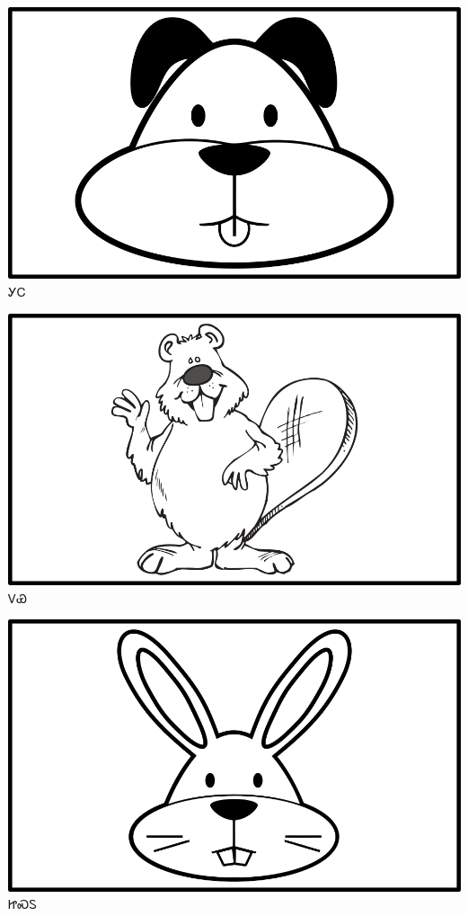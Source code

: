\documentclass[avery5371]{flashcards}%
\begin{document}
    \begin{flashcard}{
        \includegraphics[width=0.95\columnwidth,height=.51\columnwidth,keepaspectratio]{../artwork/objects-animate/gihli}
    }
        \Huge ᎩᏟ
    \end{flashcard}

    \begin{flashcard}{
        \includegraphics[width=0.95\columnwidth,height=.51\columnwidth,keepaspectratio]{../artwork/objects-animate/doya}
    }
        \Huge ᏙᏯ
    \end{flashcard}

    \begin{flashcard}{
        \includegraphics[width=0.95\columnwidth,height=.51\columnwidth,keepaspectratio]{../artwork/objects-animate/jisdu}
    }
        \Huge ᏥᏍᏚ
    \end{flashcard}
\end{document}
